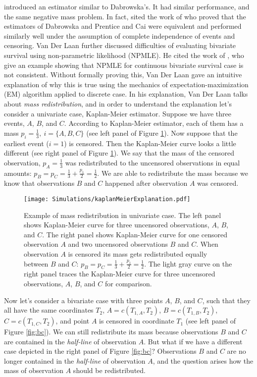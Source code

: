 \documentclass[]{article}
\begin{document}
\cite{prentice1992covariance} introduced an estimator similar to Dabrowska's. It had similar performance, and the same negative mass problem. In fact, \cite{van1997nonparametric} sited the work of \cite{gill1990survey} who proved that the estimators of Dabrowska and Prentice and Cai were equivalent and performed similarly well under the assumption of complete independence of events and censoring. Van Der Laan further discussed difficulties of evaluating bivariate survival using non-parametric likelihood (NPMLE). He cited the work of \cite{tsai1986nonparametric}, who give an example showing that NPMLE for continuous bivariate survival case is not consistent. Without formally proving this, Van Der Laan gave an intuitive explanation of why this is true using the mechanics of expectation-maximization (EM) algorithm applied to discrete case. In his explanation, Van Der Laan talks about \emph{mass redistribution}, and in order to understand the explanation let's consider a univariate case, Kaplan-Meier estimator. Suppose we have three events, $A$, $B$, and $C$. According to Kaplan-Meier estimator, each of them has a mass $p_i = \frac{1}{3},~i = \{A,B,C\}$ (see left panel of Figure \ref{fig:km}). Now suppose that the earliest event ($i=1$) is censored. Then the Kaplan-Meier curve looks a little different (see right panel of Figure \ref{fig:km}). We say that the mass of the censored observation, $p_A=\frac{1}{3}$ was redistributed to the uncensored observations in equal amounts: $p_B=p_C=\frac{1}{3}+\frac{p_1}{2} = \frac{1}{2}$. We are able to redistribute the mass because we know that observations $B$ and $C$ happened after observation $A$ was censored.\\

\begin{figure}[!h]
\caption{Example of mass redistribution in univariate case. The left panel shows Kaplan-Meier curve for three uncensored observations, $A$, $B$, and $C$. The right panel shows Kaplan-Meier curve for one censored observation $A$ and two uncensored observations $B$ and $C$. When observation $A$ is censored its mass gets redistributed equally between $B$ and $C$: $p_B=p_C=\frac{1}{3}+\frac{p_1}{2} = \frac{1}{2}$. The light gray curve on the right panel traces the Kaplan-Meier curve for three uncensored observations, $A$, $B$, and $C$ for comparison.}
\texttt{[image: Simulations/kaplanMeierExplanation.pdf]}
\label{fig:km}
\end{figure}

Now let's consider a bivariate case with three points $A$, $B$, and $C$, such that they all have the same coordinates $T_2$, $A=c(T_{1,A}, T_2)$, $B=c(T_{1,B}, T_2)$, $C=c(T_{1,C}, T_2)$, and point $A$ is censored in coordinate $T_1$ (see left panel of Figure \ref{fig:bc}). We can still redistribute its mass because observations $B$ and $C$ are contained in the \emph{half-line} of observation $A$. But what if we have a different case depicted in the right panel of Figure \ref{fig:bc}? Observations $B$ and $C$ are no longer contained in the \emph{half-line} of observation $A$, and the question arises how the mass of observation $A$ should be redistributed. 
\end{document}
